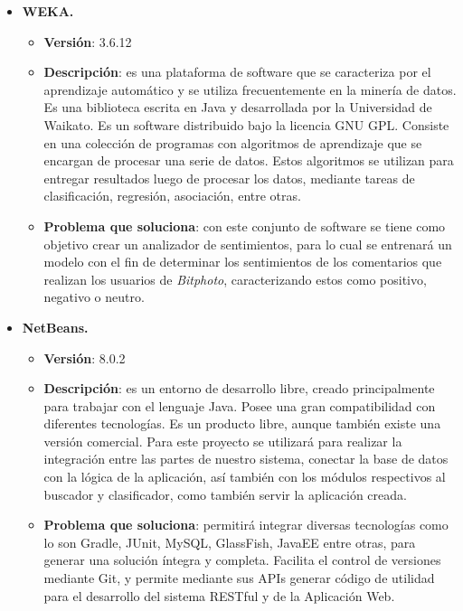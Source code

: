 \documentclass{memoria}
\begin{document}
\begin{itemize}
\item \textbf{WEKA.}
	\begin{itemize}
	\item \textbf{Versión}: 3.6.12
	\item \textbf{Descripción}: es una plataforma de software que se caracteriza por el aprendizaje automático y se utiliza frecuentemente en la minería de datos. Es una biblioteca escrita en Java y desarrollada por la Universidad de Waikato. Es un software distribuido bajo la licencia GNU GPL. Consiste en una colección de programas con algoritmos de aprendizaje que se encargan de procesar una serie de datos. Estos algoritmos se utilizan para entregar resultados luego de procesar los datos, mediante tareas de clasificación, regresión, asociación, entre otras.
	\item \textbf{Problema que soluciona}: con este conjunto de software se tiene como objetivo crear un analizador de sentimientos, para lo cual se entrenará un modelo con el fin de determinar los sentimientos de los comentarios que realizan los usuarios de \textsl{Bitphoto}, caracterizando estos como positivo, negativo o neutro.
	\end{itemize}
	
\item \textbf{NetBeans.}
	\begin{itemize}
	\item \textbf{Versión}: 8.0.2
	\item \textbf{Descripción}: es un entorno de desarrollo libre, creado principalmente para trabajar con el lenguaje Java. Posee una gran compatibilidad con diferentes tecnologías. Es un producto libre, aunque también existe una versión comercial. Para este proyecto se utilizará para realizar la integración entre las partes de nuestro sistema, conectar la base de datos con la lógica de la aplicación, así también con los módulos respectivos al buscador y clasificador, como también servir la aplicación creada.
	\item \textbf{Problema que soluciona}: permitirá integrar diversas tecnologías como lo son Gradle, JUnit, MySQL, GlassFish, JavaEE entre otras, para generar una solución íntegra y completa. Facilita el control de versiones mediante Git, y permite mediante sus APIs generar código de utilidad para el desarrollo del sistema RESTful y de la Aplicación Web.  
	\end{itemize}
\end{itemize}

\end{document}

